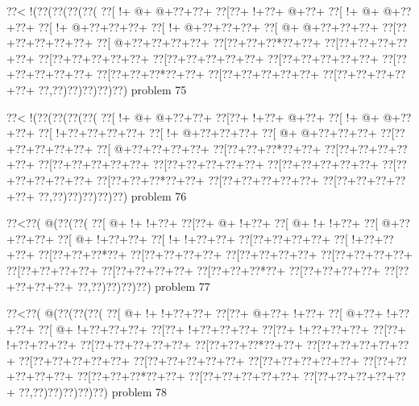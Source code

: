 \vbox{\vbox{\goo
\0??<\- !(\0??(\0??(\0??(\0??(
\0??[\- !+\- @+\- @+\0??+\0??+
\0??[\0??+\- !+\0??+\- @+\0??+
\0??[\- !+\- @+\- @+\0??+\0??+
\0??[\- !+\- @+\0??+\0??+\0??+
\0??[\- !+\- @+\0??+\0??+\0??+
\0??[\- @+\- @+\0??+\0??+\0??+
\0??[\0??+\0??+\0??+\0??+\0??+
\0??[\- @+\0??+\0??+\0??+\0??+
\0??[\0??+\0??+\0??*\0??+\0??+
\0??[\0??+\0??+\0??+\0??+\0??+
\0??[\0??+\0??+\0??+\0??+\0??+
\0??[\0??+\0??+\0??+\0??+\0??+
\0??[\0??+\0??+\0??+\0??+\0??+
\0??[\0??+\0??+\0??+\0??+\0??+
\0??[\0??+\0??+\0??*\0??+\0??+
\0??[\0??+\0??+\0??+\0??+\0??+
\0??[\0??+\0??+\0??+\0??+\0??+
\0??,\0??)\0??)\0??)\0??)\0??)
}
\hfil problem 75\hfil\break
}

\vbox{\vbox{\goo
\0??<\- !(\0??(\0??(\0??(\0??(
\0??[\- !+\- @+\- @+\0??+\0??+
\0??[\0??+\- !+\0??+\- @+\0??+
\0??[\- !+\- @+\- @+\0??+\0??+
\0??[\- !+\0??+\0??+\0??+\0??+
\0??[\- !+\- @+\0??+\0??+\0??+
\0??[\- @+\- @+\0??+\0??+\0??+
\0??[\0??+\0??+\0??+\0??+\0??+
\0??[\- @+\0??+\0??+\0??+\0??+
\0??[\0??+\0??+\0??*\0??+\0??+
\0??[\0??+\0??+\0??+\0??+\0??+
\0??[\0??+\0??+\0??+\0??+\0??+
\0??[\0??+\0??+\0??+\0??+\0??+
\0??[\0??+\0??+\0??+\0??+\0??+
\0??[\0??+\0??+\0??+\0??+\0??+
\0??[\0??+\0??+\0??*\0??+\0??+
\0??[\0??+\0??+\0??+\0??+\0??+
\0??[\0??+\0??+\0??+\0??+\0??+
\0??,\0??)\0??)\0??)\0??)\0??)
}
\hfil problem 76\hfil\break
}

\vbox{\vbox{\goo
\0??<\0??(\- @(\0??(\0??(
\0??[\- @+\- !+\- !+\0??+
\0??[\0??+\- @+\- !+\0??+
\0??[\- @+\- !+\- !+\0??+
\0??[\- @+\0??+\0??+\0??+
\0??[\- @+\- !+\0??+\0??+
\0??[\- !+\- !+\0??+\0??+
\0??[\0??+\0??+\0??+\0??+
\0??[\- !+\0??+\0??+\0??+
\0??[\0??+\0??+\0??*\0??+
\0??[\0??+\0??+\0??+\0??+
\0??[\0??+\0??+\0??+\0??+
\0??[\0??+\0??+\0??+\0??+
\0??[\0??+\0??+\0??+\0??+
\0??[\0??+\0??+\0??+\0??+
\0??[\0??+\0??+\0??*\0??+
\0??[\0??+\0??+\0??+\0??+
\0??[\0??+\0??+\0??+\0??+
\0??,\0??)\0??)\0??)\0??)
}
\hfil problem 77\hfil\break
}

\vbox{\vbox{\goo
\0??<\0??(\- @(\0??(\0??(\0??(
\0??[\- @+\- !+\- !+\0??+\0??+
\0??[\0??+\- @+\0??+\- !+\0??+
\0??[\- @+\0??+\- !+\0??+\0??+
\0??[\- @+\- !+\0??+\0??+\0??+
\0??[\0??+\- !+\0??+\0??+\0??+
\0??[\0??+\- !+\0??+\0??+\0??+
\0??[\0??+\- !+\0??+\0??+\0??+
\0??[\0??+\0??+\0??+\0??+\0??+
\0??[\0??+\0??+\0??*\0??+\0??+
\0??[\0??+\0??+\0??+\0??+\0??+
\0??[\0??+\0??+\0??+\0??+\0??+
\0??[\0??+\0??+\0??+\0??+\0??+
\0??[\0??+\0??+\0??+\0??+\0??+
\0??[\0??+\0??+\0??+\0??+\0??+
\0??[\0??+\0??+\0??*\0??+\0??+
\0??[\0??+\0??+\0??+\0??+\0??+
\0??[\0??+\0??+\0??+\0??+\0??+
\0??,\0??)\0??)\0??)\0??)\0??)
}
\hfil problem 78\hfil\break
}

